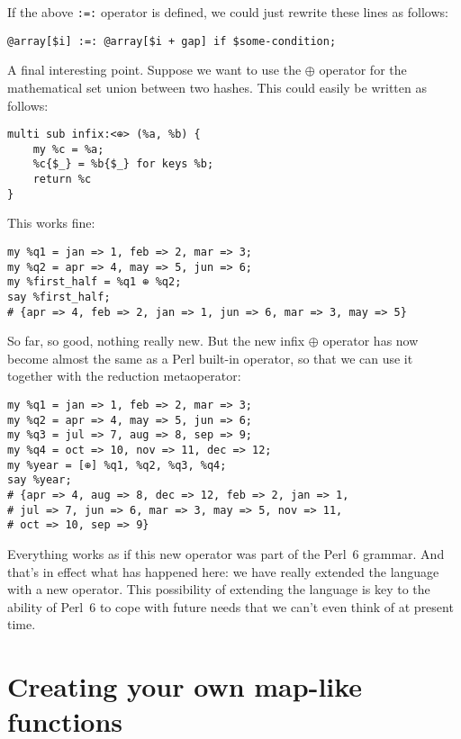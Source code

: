 If the above  \verb':=:' operator is defined, we 
could just rewrite these lines as follows:

\begin{verbatim}
@array[$i] :=: @array[$i + gap] if $some-condition;
\end{verbatim}

A final interesting point. Suppose we want to use 
the $\oplus$ operator for the mathematical set 
union between two hashes. This could easily be 
written as follows:

\begin{verbatim}
multi sub infix:<⊕> (%a, %b) {
    my %c = %a;
    %c{$_} = %b{$_} for keys %b;
    return %c
}
\end{verbatim}

This works fine:

\begin{verbatim}
my %q1 = jan => 1, feb => 2, mar => 3;
my %q2 = apr => 4, may => 5, jun => 6;
my %first_half = %q1 ⊕ %q2;
say %first_half;
# {apr => 4, feb => 2, jan => 1, jun => 6, mar => 3, may => 5}
\end{verbatim}

So far, so good, nothing really new. But the new 
infix $\oplus$ operator has now become almost the same 
as a Perl built-in operator, so that we can use it 
together with the reduction metaoperator:

\begin{verbatim}
my %q1 = jan => 1, feb => 2, mar => 3;
my %q2 = apr => 4, may => 5, jun => 6;
my %q3 = jul => 7, aug => 8, sep => 9;
my %q4 = oct => 10, nov => 11, dec => 12;
my %year = [⊕] %q1, %q2, %q3, %q4;
say %year;
# {apr => 4, aug => 8, dec => 12, feb => 2, jan => 1, 
# jul => 7, jun => 6, mar => 3, may => 5, nov => 11, 
# oct => 10, sep => 9}
\end{verbatim}

Everything works as if this new operator was part 
of the Perl~6 grammar. And that's in effect what 
has happened here: we have really extended the 
language with a new operator. This possibility of 
extending the language is key to the ability of  
Perl~6 to cope with future needs that we can't even 
think of at present time.

\section{Creating your own map-like functions}
 
